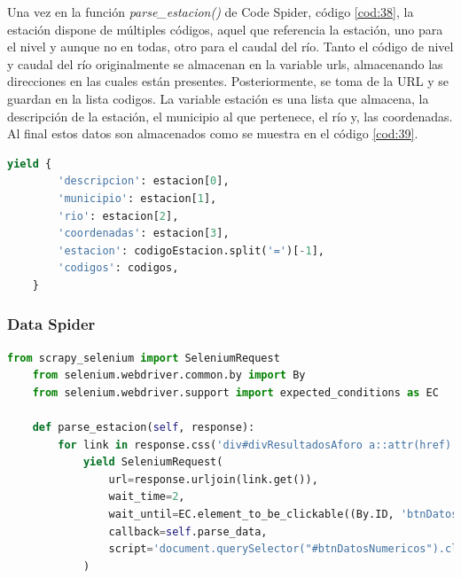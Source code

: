 Una vez en la función \textit{parse\_estacion()} de Code Spider, código \ref{cod:38}, la estación dispone de múltiples códigos, aquel que referencia la estación, uno para el nivel y aunque no en todas, otro para el caudal del río. Tanto el código de nivel y caudal del río originalmente se almacenan en la variable urls, almacenando las direcciones en las cuales están presentes. Posteriormente, se toma de la URL y se guardan en la lista codigos. La variable estación es una lista que almacena, la descripción de la estación, el municipio al que pertenece, el río y, las coordenadas. Al final estos datos son almacenados como se muestra en el código \ref{cod:39}.

\begin{lstlisting}[language=Python, caption={Guardado de datos de Agua en Navarra Code Spider}, label=cod:39]
	yield {
		'descripcion': estacion[0],
		'municipio': estacion[1],
		'rio': estacion[2],
		'coordenadas': estacion[3],
		'estacion': codigoEstacion.split('=')[-1],
		'codigos': codigos,
	}
\end{lstlisting}

\subsubsection{Data Spider}

\begin{lstlisting}[language=Python, caption={Función \textit{parse\_estacion()} Agua en Navarra Data Spider}, label=cod:40]
	from scrapy_selenium import SeleniumRequest
	from selenium.webdriver.common.by import By
	from selenium.webdriver.support import expected_conditions as EC
	
	def parse_estacion(self, response):
		for link in response.css('div#divResultadosAforo a::attr(href)'):
			yield SeleniumRequest(
				url=response.urljoin(link.get()),
				wait_time=2,
				wait_until=EC.element_to_be_clickable((By.ID, 'btnDatosNumericos')),
				callback=self.parse_data,
				script='document.querySelector("#btnDatosNumericos").click()',
			)
\end{lstlisting}

